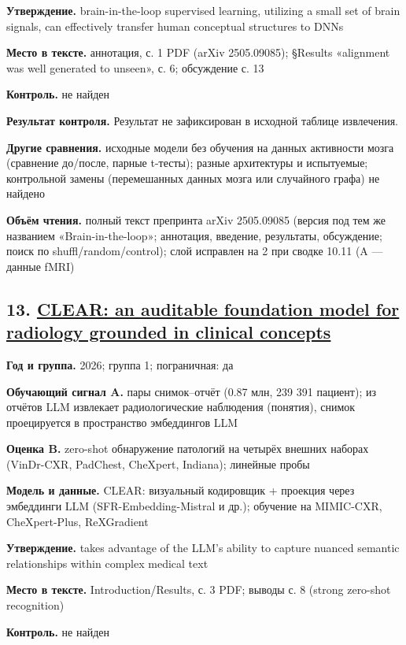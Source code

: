 \textbf{Утверждение.} brain-in-the-loop supervised learning, utilizing a small set of brain signals, can effectively transfer human conceptual structures to DNNs

\textbf{Место в тексте.} аннотация, с. 1 PDF (arXiv 2505.09085); §Results «alignment was well generated to unseen», с. 6; обсуждение с. 13

\textbf{Контроль.} не найден

\textbf{Результат контроля.} Результат не зафиксирован в исходной таблице извлечения.

\textbf{Другие сравнения.} исходные модели без обучения на данных активности мозга (сравнение до/после, парные t-тесты); разные архитектуры и испытуемые; контрольной замены (перемешанных данных мозга или случайного графа) не найдено

\textbf{Объём чтения.} полный текст препринта arXiv 2505.09085 (версия под тем же названием «Brain-in-the-loop»; аннотация, введение, результаты, обсуждение; поиск по shuffl/random/control); слой исправлен на 2 при сводке 10.11 (A — данные fMRI)


\subsection*{13. \href{https://doi.org/10.1038/s41551-026-01741-4}{CLEAR: an auditable foundation model for radiology grounded in clinical concepts}}

\textbf{Год и группа.} 2026; группа 1; пограничная: да

\textbf{Обучающий сигнал A.} пары снимок–отчёт (0.87 млн, 239 391 пациент); из отчётов LLM извлекает радиологические наблюдения (понятия), снимок проецируется в пространство эмбеддингов LLM

\textbf{Оценка B.} zero-shot обнаружение патологий на четырёх внешних наборах (VinDr-CXR, PadChest, CheXpert, Indiana); линейные пробы

\textbf{Модель и данные.} CLEAR: визуальный кодировщик + проекция через эмбеддинги LLM (SFR-Embedding-Mistral и др.); обучение на MIMIC-CXR, CheXpert-Plus, ReXGradient

\textbf{Утверждение.} takes advantage of the LLM's ability to capture nuanced semantic relationships within complex medical text

\textbf{Место в тексте.} Introduction/Results, с. 3 PDF; выводы с. 8 (strong zero-shot recognition)

\textbf{Контроль.} не найден

